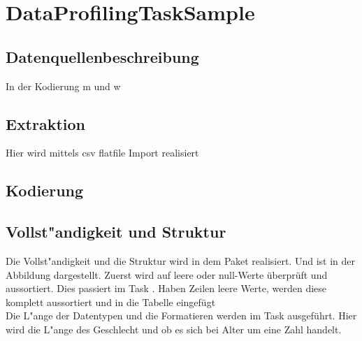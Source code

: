 \section{DataProfilingTaskSample}
\subsection{Datenquellenbeschreibung}
 {In der Kodierung m und w}



\subsection{Extraktion}
Hier wird mittels csv flatfile Import realisiert
\subsection{Kodierung}
\subsection{Vollst"andigkeit und Struktur}
Die Vollst"andigkeit und die Struktur wird in dem Paket  realisiert. Und ist in der Abbildung  dargestellt. Zuerst wird auf leere oder null-Werte überprüft und aussortiert. Dies passiert im Task . Haben Zeilen leere Werte, werden diese komplett aussortiert und in die Tabelle eingefügt\\

Die L"ange der Datentypen und die Formatieren werden im Task  ausgeführt. Hier wird die L"ange des Geschlecht und ob es sich bei Alter um eine Zahl handelt.

